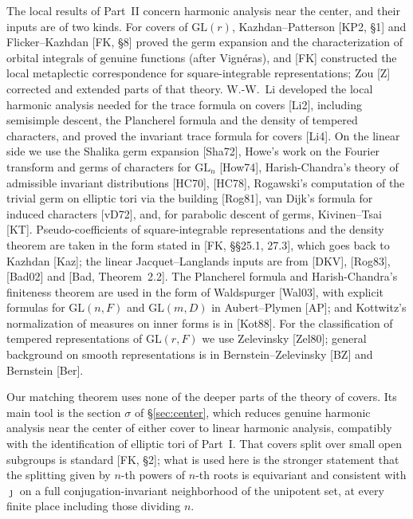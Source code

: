 \documentclass[12pt]{article}
\newcommand{\GL}{\mathrm{GL}}
\newcommand{\jj}{\jmath}
\newcommand{\sg}{\sigma}
\theoremstyle{plain}
\theoremstyle{definition}
\begin{document}
The local results of Part~II concern harmonic analysis near the center, and their inputs are of two kinds. For covers of $\GL(r)$, Kazhdan--Patterson [KP2, \S1] and Flicker--Kazhdan [FK, \S8] proved the germ expansion and the characterization of orbital integrals of genuine functions (after Vign\'eras), and [FK] constructed the local metaplectic correspondence for square-integrable representations; Zou [Z] corrected and extended parts of that theory. W.-W.~Li developed the local harmonic analysis needed for the trace formula on covers [Li2], including semisimple descent, the Plancherel formula and the density of tempered characters, and proved the invariant trace formula for covers [Li4]. On the linear side we use the Shalika germ expansion [Sha72], Howe's work on the Fourier transform and germs of characters for $\GL_n$ [How74], Harish-Chandra's theory of admissible invariant distributions [HC70], [HC78], Rogawski's computation of the trivial germ on elliptic tori via the building [Rog81], van Dijk's formula for induced characters [vD72], and, for parabolic descent of germs, Kivinen--Tsai [KT]. Pseudo-coefficients of square-integrable representations and the density theorem are taken in the form stated in [FK, \S\S25.1, 27.3], which goes back to Kazhdan [Kaz]; the linear Jacquet--Langlands inputs are from [DKV], [Rog83], [Bad02] and [Bad, Theorem~2.2]. The Plancherel formula and Harish-Chandra's finiteness theorem are used in the form of Waldspurger [Wal03], with explicit formulas for $\GL(n,F)$ and $\GL(m,D)$ in Aubert--Plymen [AP]; and Kottwitz's normalization of measures on inner forms is in [Kot88]. For the classification of tempered representations of $\GL(r,F)$ we use Zelevinsky [Zel80]; general background on smooth representations is in Bernstein--Zelevinsky [BZ] and Bernstein [Ber].

Our matching theorem uses none of the deeper parts of the theory of covers. Its main tool is the section $\sg$ of \S\ref{sec:center}, which reduces genuine harmonic analysis near the center of either cover to linear harmonic analysis, compatibly with the identification of elliptic tori of Part~I. That covers split over small open subgroups is standard [FK, \S2]; what is used here is the stronger statement that the splitting given by $n$-th powers of $n$-th roots is equivariant and consistent with $\jj$ on a full conjugation-invariant neighborhood of the unipotent set, at every finite place including those dividing $n$.

\end{document}
